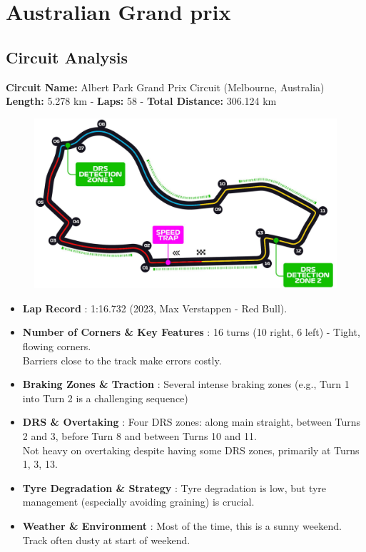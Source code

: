 \section{Australian Grand prix}

\subsection{Circuit Analysis}

\textbf{Circuit Name:} Albert Park Grand Prix Circuit (Melbourne, Australia) \\
\textbf{Length:} 5.278 km - \textbf{Laps:} 58 - \textbf{Total Distance:} 306.124 km

\begin{figure}[H]
    \centering
    \includegraphics[width=0.75\linewidth]{images/3.Australia_Circuit.jpg}
\end{figure}

\begin{itemize}
    \item \textbf{Lap Record} : 1:16.732 (2023, Max Verstappen - Red Bull).
    
    \item \textbf{Number of Corners \& Key Features} : 16 turns (10 right, 6 left) - Tight, flowing corners.\\
    Barriers close to the track make errors costly.
    
    \item \textbf{Braking Zones \& Traction} : Several intense braking zones (e.g., Turn 1 into Turn 2 is a challenging sequence)
    
    \item \textbf{DRS \& Overtaking} : Four DRS zones: along main straight, between Turns 2 and 3, before Turn 8 and between Turns 10 and 11. \\
    Not heavy on overtaking despite having some DRS zones, primarily at Turns 1, 3, 13.
    
    \item \textbf{Tyre Degradation \& Strategy} : Tyre degradation is low, but tyre management (especially avoiding graining) is crucial.

    \item \textbf{Weather \& Environment} : Most of the time, this is a sunny weekend. Track often dusty at start of weekend.
\end{itemize}

